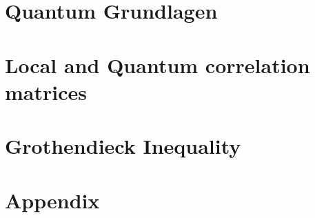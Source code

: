 \newpage
\section{Quantum Grundlagen} %
	\vspace{8pt}
	
%	

\section{Local and Quantum correlation matrices} %
	\vspace{8pt}

	

\section{Grothendieck Inequality} %
	

\section*{Appendix}
		



	
